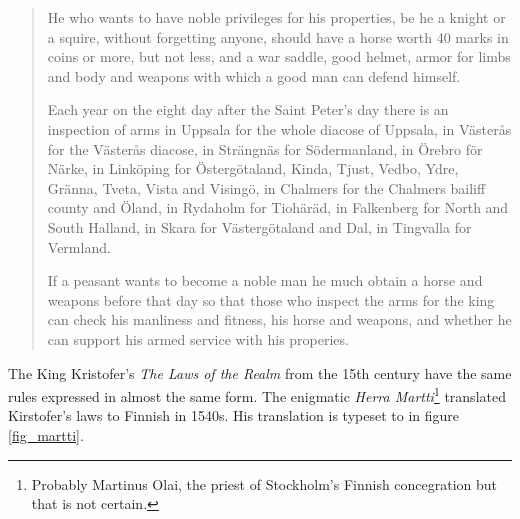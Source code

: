\documentclass[a4paper]{article}
\begin{document}
\begin{quote}
  He who wants to have noble privileges for his properties, be he a
  knight or a squire, without forgetting anyone, should have a horse
  worth 40 marks in coins or more, but not less, and a war saddle,
  good helmet, armor for limbs and body and weapons with which a good
  man can defend himself.  

  Each year on the eight day after the Saint Peter's day there is an
  inspection of arms in Uppsala for the whole diacose of Uppsala, in
  Västerås for the Västerås diacose, in Strängnäs for Södermanland, in
  Örebro för Närke, in Linköping for Östergötaland, Kinda, Tjust,
  Vedbo, Ydre, Gränna, Tveta, Vista and Visingö, in Chalmers for the
  Chalmers bailiff county and Öland, in Rydaholm for Tiohäräd, in
  Falkenberg for North and South Halland, in Skara for Västergötaland
  and Dal, in Tingvalla for Vermland. 

  If a peasant wants to become a noble man he much obtain a horse and
  weapons before that day so that those who inspect the arms for the
  king can check his manliness and fitness, his horse and weapons, and
  whether he can support his armed service with his properies. 

\end{quote}

The King Kristofer's \emph{The Laws of the Realm} from the 15th
century have the same rules expressed in almost the same form. The
enigmatic \emph{Herra Martti}\footnote{Probably Martinus Olai, the
  priest of Stockholm's Finnish concegration but that is not certain.}
translated Kirstofer's laws to Finnish in 1540s. His translation is
typeset to \Aboensis{} in figure \ref{fig_martti}. 
\end{document}
